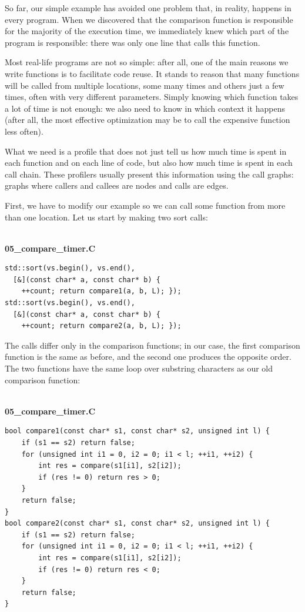 
So far, our simple example has avoided one problem that, in reality, happens in every program. When we discovered that the comparison function is responsible for the majority of the execution time, we immediately knew which part of the program is responsible: there was only one line that calls this function.

Most real-life programs are not so simple: after all, one of the main reasons we write functions is to facilitate code reuse. It stands to reason that many functions will be called from multiple locations, some many times and others just a few times, often with very different parameters. Simply knowing which function takes a lot of time is not enough: we also need to know in which context it happens (after all, the most effective optimization may be to call the expensive function less often).

What we need is a profile that does not just tell us how much time is spent in each function and on each line of code, but also how much time is spent in each call chain. These profilers usually present this information using the call graphs: graphs where callers and callees are nodes and calls are edges.

First, we have to modify our example so we can call some function from more than one location. Let us start by making two sort calls:

\hspace*{\fill} \\ %
\noindent
\textbf{05\_compare\_timer.C}
\begin{lstlisting}[style=styleCXX]
std::sort(vs.begin(), vs.end(),
  [&](const char* a, const char* b) {
	++count; return compare1(a, b, L); });
std::sort(vs.begin(), vs.end(),
  [&](const char* a, const char* b) {
	++count; return compare2(a, b, L); });
\end{lstlisting}

The calls differ only in the comparison functions; in our case, the first comparison function is the same as before, and the second one produces the opposite order. The two functions have the same loop over substring characters as our old comparison function:

\hspace*{\fill} \\ %
\noindent
\textbf{05\_compare\_timer.C}
\begin{lstlisting}[style=styleCXX]
bool compare1(const char* s1, const char* s2, unsigned int l) {
	if (s1 == s2) return false;
	for (unsigned int i1 = 0, i2 = 0; i1 < l; ++i1, ++i2) {
		int res = compare(s1[i1], s2[i2]);
		if (res != 0) return res > 0;
	}
	return false;
}
bool compare2(const char* s1, const char* s2, unsigned int l) {
	if (s1 == s2) return false;
	for (unsigned int i1 = 0, i2 = 0; i1 < l; ++i1, ++i2) {
		int res = compare(s1[i1], s2[i2]);
		if (res != 0) return res < 0;
	}
	return false;
}
\end{lstlisting}

